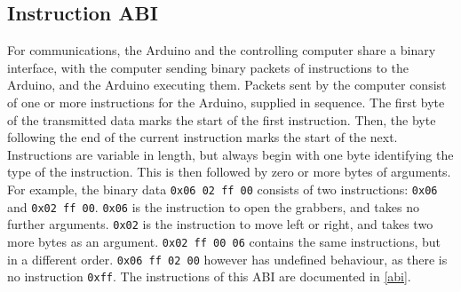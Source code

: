 \subsection{Instruction ABI}

For communications, the Arduino and the controlling computer share a binary
interface, with the computer sending binary packets of instructions to the
Arduino, and the Arduino executing them. Packets sent by the computer consist
of one or more instructions for the Arduino, supplied in sequence. The first
byte of the transmitted data marks the start of the first instruction. Then, the
byte following the end of the current instruction marks the start of the next.
Instructions are variable in length, but always begin with one byte identifying
the type of the instruction. This is then followed by zero or more bytes of
arguments. For example, the binary data \texttt{0x06 02 ff 00} consists of two
instructions: \texttt{0x06} and \texttt{0x02 ff 00}. \texttt{0x06} is the
instruction to open the grabbers, and takes no further arguments. \texttt{0x02}
is the instruction to move left or right, and takes two more bytes as an
argument. \texttt{0x02 ff 00 06} contains the same instructions, but in a
different order. \texttt{0x06 ff 02 00} however has undefined behaviour, as
there is no instruction \texttt{0xff}. The instructions of this ABI are
documented in \cref{abi}.
